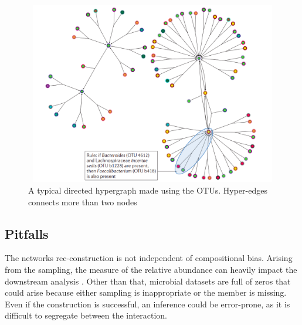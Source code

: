 \begin{figure}
  \centering
  \includegraphics[width=12cm, height=8cm] {../figures/Figure8.png}
  \caption[A typical directed hypergraph]{A typical directed hypergraph made using the OTUs. Hyper-edges connects more than two nodes}
  \label{fig:figure8}
\end{figure}

\subsection*{Pitfalls}
The networks rec-construction is not independent of compositional bias. Arising from the sampling, the measure of the relative abundance can heavily impact the downstream analysis \cite{faust_2012_microbial}. Other than that, microbial datasets are full of zeros that could arise because either sampling is inappropriate or the member is missing. Even if the construction is successful, an inference could be error-prone, as it is difficult to segregate between the interaction.
